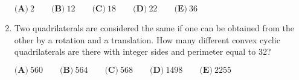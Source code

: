 \documentclass{article}
\begin{document}
\begin{enumerate}[label=\arabic*., itemsep=0.5em]
$\textbf{(A)}\ 2 \qquad \textbf{(B)}\ 12 \qquad \textbf{(C)}\ 18 \qquad \textbf{(D)}\ 22 \qquad \textbf{(E)}\ 36$\par \vspace{0.5em}\item Two quadrilaterals are considered the same if one can be obtained from the other by a rotation and a translation. How many different convex cyclic quadrilaterals are there with integer sides and perimeter equal to 32?

$\textbf{(A)}\ 560 \qquad \textbf{(B)}\ 564 \qquad \textbf{(C)}\ 568 \qquad \textbf{(D)}\ 1498 \qquad \textbf{(E)}\ 2255$\par \vspace{0.5em}\end{enumerate}
\end{document}

